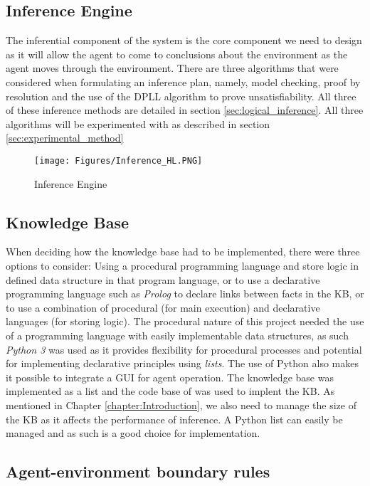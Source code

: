 \subsection{Inference Engine}
The inferential component of the system is the core component we need to design as it will allow the agent to come to conclusions about the environment as the agent moves through the environment. There are three algorithms that were considered when formulating an inference plan, namely, model checking, proof by resolution and the use of the DPLL algorithm to prove unsatisfiability. All three of these inference methods are detailed in section \ref{sec:logical_inference}. All three algorithms will be experimented with as described in section \ref{sec:experimental_method}

\begin{figure}[H]
    \centering
    \texttt{[image: Figures/Inference\_HL.PNG]}
    \caption{Inference Engine} 
    \label{fig:inference_engine}
\end{figure}

\subsection{Knowledge Base}

When deciding how the knowledge base had to be implemented, there were three options to consider: Using a procedural programming language and store logic in defined data structure in that program language, or to use a declarative programming language such as \textit{Prolog} to declare links between facts in the KB, or to use a combination of procedural (for main execution) and declarative languages (for storing logic). The procedural nature of this project needed the use of a programming language with easily implementable data structures, as such \textit{Python 3} was used as it provides flexibility for procedural processes and potential for implementing declarative principles using \textit{lists}. The use of Python also makes it possible to integrate a GUI for agent operation. The knowledge  base was implemented as a list and the code base of \citep{russell2016artificial} was used to implent the KB. As mentioned in Chapter \ref{chapter:Introduction}, we also need to manage the size of the KB as it affects the performance of inference. A Python list can easily be managed and as such is a good choice for implementation.

\subsection{Agent-environment boundary rules}

